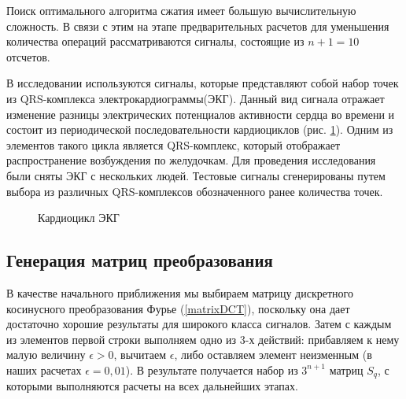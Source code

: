 \documentclass[11pt, oneside, a4paper]{article}
\begin{document}
Поиск оптимального алгоритма сжатия имеет большую вычислительную сложность. В связи с этим на этапе предварительных расчетов для уменьшения количества операций рассматриваются сигналы, состоящие из $n+1=10$ отсчетов. 

В исследовании используются сигналы, которые представляют собой набор точек из QRS-комплекса электрокардиограммы(ЭКГ). Данный вид сигнала отражает изменение разницы электрических потенциалов активности сердца во времени и состоит из периодической последовательности кардиоциклов (рис. \ref{qsr-complex}). Одним из элементов такого цикла является QRS-комплекс, который отображает распространение возбуждения по желудочкам. Для проведения исследования были сняты ЭКГ с нескольких людей. Тестовые сигналы сгенерированы путем выбора из различных QRS-комплексов обозначенного ранее количества точек.

\begin{figure}[h]
	\caption{Кардиоцикл ЭКГ}
	\label{qsr-complex}
\end{figure}

\subsection{Генерация матриц преобразования}

В качестве начального приближения мы выбираем матрицу дискретного косинусного преобразования Фурье (\ref{matrixDCT}), поскольку она дает достаточно хорошие результаты для широкого класса сигналов. Затем с каждым из элементов первой строки выполняем одно из 3-х действий: прибавляем к нему малую величину $\epsilon>0$, вычитаем $\epsilon$, либо оставляем элемент неизменным (в наших расчетах $\epsilon=0,01$). В результате получается набор из $3^{n+1}$ матриц $S_q$, с которыми выполняются расчеты на всех дальнейших этапах.
\end{document}
